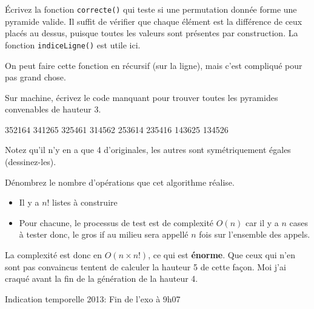 \documentclass[10pt]{article}\usepackage[nu]{esial}
\begin{document}
\begin{Question}
  Écrivez la fonction \texttt{correcte()} qui teste si une permutation donnée
  forme une pyramide valide. Il suffit de vérifier que chaque élément est la
  différence de ceux placés au dessus, puisque toutes les valeurs sont présentes
  par construction. La fonction \texttt{indiceLigne()} est utile ici.
\end{Question}
\begin{Reponse}
  On peut faire cette fonction en récursif (sur la ligne), mais c'est compliqué
  pour pas grand chose.

  \newcommand*\FancyVerbStopString{// END CORRECTE}
  \newcommand*\FancyVerbStartString{// BEGIN CORRECTE}
\end{Reponse}
\begin{Question}
  Sur machine, écrivez le code manquant pour trouver toutes les pyramides
  convenables de hauteur 3.
\end{Question}
\begin{Reponse}
  352164 341265 325461 314562 253614 235416 143625 134526

  Notez qu'il n'y en a que 4 d'originales, les autres sont symétriquement
  égales (dessinez-les). 
\end{Reponse}

\begin{Question}
  Dénombrez le nombre d'opérations que cet algorithme réalise.
\end{Question}
\begin{Reponse}
  \begin{itemize}
  \item Il y a $n!$ listes à construire
  \item Pour chacune, le processus de test est de complexité $O(n)$ car il y a
    $n$ cases à tester donc, le gros if au milieu sera appellé $n$ fois sur
    l'ensemble des appels.
  \end{itemize}
  La complexité est donc en $O(n\times n!)$, ce qui est \textbf{énorme}. Que
  ceux qui n'en sont pas convaincus tentent de calculer la hauteur 5 de cette
  façon. Moi j'ai craqué avant la fin de la génération de la hauteur 4.

  Indication temporelle 2013: Fin de l'exo à 9h07
\end{Reponse}
\end{document}
